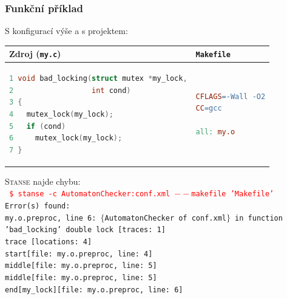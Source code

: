 \documentclass[handout,xcolor=dvipsnames]{beamer}
\begin{document}
\begin{frame}[fragile]
  \frametitle{Funkční příklad}
  S konfigurací výše a s projektem:
  \begin{center}
  \begin{tabular}{|l|l|} \hline
  Zdroj (\texttt{my.c}) & \texttt{Makefile} \\ \hline \hline
  \begin{lstlisting}[language=C]
1 void bad_locking(struct mutex *my_lock,
2                  int cond)
3 {
4   mutex_lock(my_lock);
5   if (cond)
6     mutex_lock(my_lock);
7 }
  \end{lstlisting}
  &
  \begin{lstlisting}[language=make]
CFLAGS=-Wall -O2
CC=gcc

all: my.o
  \end{lstlisting} \\ \hline
  \end{tabular}
  \end{center}

  \pause

  \textsc{Stanse} najde chybu: \\
{\scriptsize\texttt{%
\textcolor{red}{\$ stanse -c AutomatonChecker:conf.xml $--$makefile
'Makefile'} \\
\pause
Error(s) found: \\
my.o.preproc, line 6: $\{$AutomatonChecker of conf.xml$\}$ in function 'bad\_locking' double lock [traces: 1] \\
trace [locations: 4] \\
start[file: my.o.preproc, line: 4] \\
middle[file: my.o.preproc, line: 5] \\
middle[file: my.o.preproc, line: 5] \\
end[my\_lock][file: my.o.preproc, line: 6] \\
}}

\end{frame}
\end{document}
